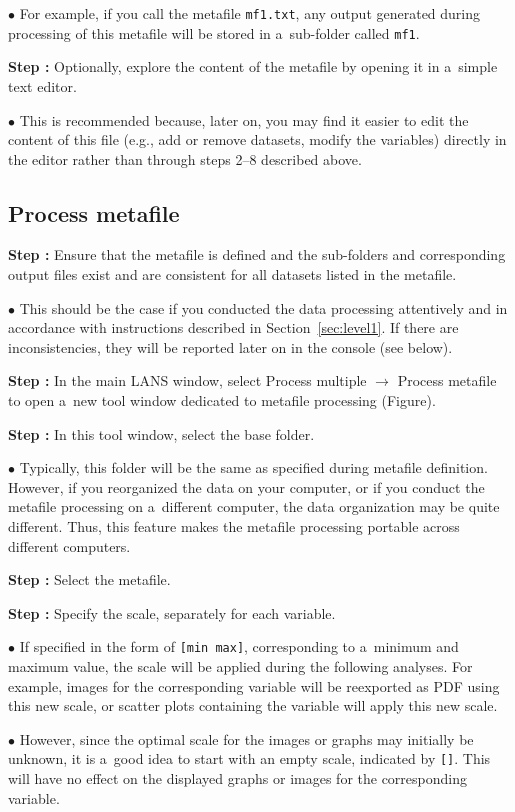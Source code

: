 \documentclass[a4paper, 11pt]{article}
\newcommand{\ttt}[1]{\texttt{#1}}
\newcommand{\lans}[1]{{\color{magenta}#1}}
\newcommand{\lanstf}[1]{{\color{cyan}#1}}
\newcommand\ra{\rightarrow}
\newcounter{step}
\newcommand\s{\addtocounter{step}{1}\noindent\textbf{Step \thestep:}{ }}
\newcommand\bul{\noindent$\bullet${ }}
\begin{document}
\bul For example, if you call the metafile \ttt{mf1.txt}, any output generated during processing of this metafile will be stored in a~sub-folder called \ttt{mf1}.

\s Optionally, explore the content of the metafile by opening it in a~simple text editor.

\bul This is recommended because, later on, you may find it easier to edit the content of this file (e.g., add or remove datasets, modify the variables) directly in the editor rather than through steps 2--8 described above.


\subsection{Process metafile}
\setcounter{step}{0}

\s Ensure that the metafile is defined and the sub-folders and corresponding output files exist and are consistent for all datasets listed in the metafile.

\bul This should be the case if you conducted the data processing attentively and in accordance with instructions described in Section~\ref{sec:level1}. If there are inconsistencies, they will be reported later on in the console (see below).

\s In the main LANS window, select \lans{Process multiple} $\ra$ \lans{Process metafile} to open a~new tool window dedicated to metafile processing (Figure).

\s In this tool window, select the \lanstf{base folder}.

\bul Typically, this folder will be the same as specified during metafile definition. However, if you reorganized the data on your computer, or if you conduct the metafile processing on a~different computer, the data organization may be quite different. Thus, this feature makes the metafile processing portable across different computers.

\s Select the \lanstf{metafile}.

\s Specify  the \lanstf{scale}, separately for each variable.

\bul If specified in the form of \ttt{[min max]}, corresponding to a~minimum and maximum value, the scale will be applied during the following analyses. For example, images for the corresponding variable will be reexported as PDF using this new scale, or scatter plots containing the variable will apply this new scale.

\bul However, since the optimal scale for the images or graphs may initially be unknown, it is a~good idea to start with an empty scale, indicated by \ttt{[]}. This will have no effect on the displayed graphs or images for the corresponding variable.
\end{document}
